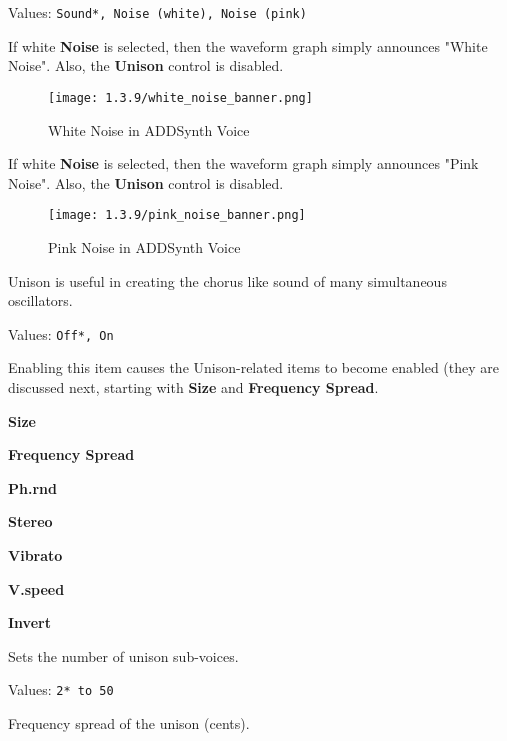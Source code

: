    Values: \texttt{Sound*, Noise (white), Noise (pink)}

   If white \textbf{Noise} is selected, then the waveform graph simply announces
   "White Noise".  Also, the \textbf{Unison} control is
   disabled.

\begin{figure}[H]
   \centering 
   \texttt{[image: 1.3.9/white\_noise\_banner.png]}
   \caption{White Noise in ADDSynth Voice}
   \label{fig:voice_oscillator_white_noise}
\end{figure}

   If white \textbf{Noise} is selected, then the waveform graph simply announces
   "Pink Noise".  Also, the \textbf{Unison} control is
   disabled.

\begin{figure}[H]
   \centering 
   \texttt{[image: 1.3.9/pink\_noise\_banner.png]}
   \caption{Pink Noise in ADDSynth Voice}
   \label{fig:voice_oscillator_pink_noise}
\end{figure}

   Unison is useful in creating the chorus like sound of many simultaneous
   oscillators.

   Values: \texttt{Off*, On}

   Enabling this item causes the Unison-related items to become
   enabled (they are discussed next, starting with \textbf{Size}
   and \textbf{Frequency Spread}.

   \begin{enumber}
      \item \textbf{Size}
      \item \textbf{Frequency Spread}
      \item \textbf{Ph.rnd}
      \item \textbf{Stereo}
      \item \textbf{Vibrato}
      \item \textbf{V.speed}
      \item \textbf{Invert}
   \end{enumber}

   \setcounter{ItemCounter}{0}      %

   Sets the number of unison sub-voices.

   Values: \texttt{2* to 50}

   Frequency spread of the unison (cents).

